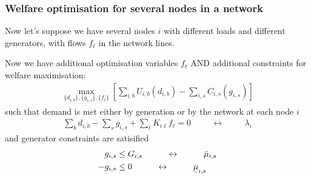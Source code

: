 \documentclass[10pt,aspectratio=169,dvipsnames]{beamer}
\def\l{\lambda}
\def\m{\mu}
\newcommand{\ubar}[1]{\text{\b{$#1$}}}
\begin{document}
\begin{frame}[fragile]
  \frametitle{Welfare optimisation for several nodes in a network}

  Now let's suppose we have several nodes $i$ with different loads and
  different generators, with flows $f_\ell$ in the network lines.

  Now we have additional optimisation variables $f_\ell$ AND
  additional constraints for welfare maximisation:
  \begin{align*}
    \max_{\{d_{i,b}\},\{g_{i,s}\},\{f_\ell\}}\left[\sum_{i,b} U_{i,b}(d_{i,b}) - \sum_{i,s} C_{i,s} (g_{i,s}) \right]
  \end{align*}
  such that demand is met either by generation or by the network at each node $i$
  \begin{align*}
    \sum_{b} d_{i,b} - \sum_{s} g_{i,s} +  \sum_\ell K_{i\ell}f_\ell  = 0 \hspace{1cm}\leftrightarrow\hspace{1cm} \l_i
  \end{align*}
  and generator constraints are satisified
    \begin{align*}
        g_{i,s}  & \leq  G_{i,s}  \hspace{1cm}\leftrightarrow\hspace{1cm} \bar{\m}_{i,s} \\
    - g_{i,s}  & \leq  0  \hspace{1cm}\leftrightarrow\hspace{1cm} \ubar{\m}_{i,s}
  \end{align*}



\end{frame}
\end{document}
